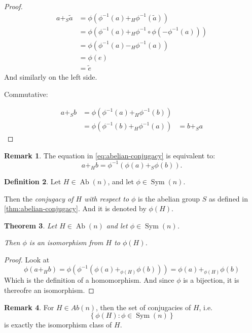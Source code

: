 \documentclass[a4paper, 12pt, english]{article}
\theoremstyle{plain}
\newtheorem{theorem}{Theorem}[section]
\theoremstyle{definition}
\newtheorem{definition}[theorem]{Definition}
\newtheorem{remark}[theorem]{Remark}
\newcommand{\set}[1]{ \left\{ #1 \right\} } %
\DeclareMathOperator{\Ab}{Ab}
\DeclareMathOperator{\Sym}{Sym}
\begin{document}
\begin{proof}
    \begin{align*}
        a +_S \tilde{a} &= \phi(\phi^{-1}(a) +_H \phi^{-1}(\tilde{a})) \\
        &= \phi(\phi^{-1}(a) +_H \phi^{-1} \circ \phi(-\phi^{-1}(a))) \\
        &= \phi(\phi^{-1}(a) -_H \phi^{-1}(a)) \\
        &= \phi(e) \\
        &= \tilde{e}
    \end{align*}
    And similarly on the left side.

    Commutative:

    \begin{align*}
        a +_S b &= \phi(\phi^{-1}(a) +_H \phi^{-1}(b)) \\
        &= \phi(\phi^{-1}(b) +_H \phi^{-1}(a))
        &= b +_S a
    \end{align*}
\end{proof}

\begin{remark}
    The equation in \autoref{eq:abelian-conjugacy} is equivalent to:
    \[
        a +_H b = \phi^{-1}(\phi(a) +_S \phi(b)).
    \]
\end{remark}

\begin{definition} \label{def:abelian-conjugacy}
    Let \( H \in \Ab(n) \), and let \( \phi \in \Sym(n) \).

    Then the \emph{conjugacy of \( H \) with respect to \( \phi \)} is the abelian group \( S \) as defined in \autoref{thm:abelian-conjugacy}. And it is denoted by \( \phi(H) \).
\end{definition}

\begin{theorem} \label{thm:conjugacy-isomorphism}
    Let \( H \in \Ab(n) \) and let \( \phi \in \Sym(n) \).

    Then \( \phi \) is an isomorphism from \( H \) to \( \phi(H) \).
\end{theorem}
\begin{proof}
    Look at
    \[
        \phi(a +_H b) = \phi(\phi^{-1}(\phi(a) +_{\phi(H)} \phi(b))) = \phi(a) +_{\phi(H)} \phi(b)
    \]
    Which is the definition of a homomorphism. And since \( \phi \) is a bijection, it is thereofre an isomorphism.
\end{proof}

\begin{remark}
    For \( H \in Ab(n) \), then the set of conjugacies of \( H \), i.e. 
    \[
        \set{\phi(H) : \phi \in \Sym(n)}
    \]
    is exactly the isomorphism class of \( H \).
\end{remark}
\end{document}
